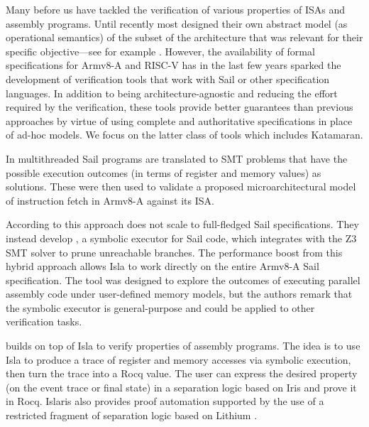 Many before us have tackled the verification of various properties of ISAs and assembly programs. Until recently most designed their own abstract model (\eg as operational semantics) of the subset of the architecture that was relevant for their specific objective---see for example \cite{Georges2021}\cite{Jensen2013}\cite{Guanciale2016}. However, the availability of formal specifications for Armv8-A and RISC-V \cite{Armstrong2019} has in the last few years sparked the development of verification tools that work with Sail or other specification languages. In addition to being architecture-agnostic and reducing the effort required by the verification, these tools provide better guarantees than previous approaches by virtue of using complete and authoritative specifications in place of ad-hoc models. We focus on the latter class of tools which includes Katamaran.

In \cite{Simner2020} multithreaded Sail programs are translated to SMT problems that have the possible execution outcomes (in terms of register and memory values) as solutions. These were then used to validate a proposed microarchitectural model of instruction fetch in Armv8-A against its ISA.

According to \cite{Armstrong2021} this approach does not scale to full-fledged Sail specifications. They instead develop , a symbolic executor for Sail code, which integrates with the Z3 SMT solver to prune unreachable branches. The performance boost from this hybrid approach allows Isla to work directly on the entire Armv8-A Sail specification. The tool was designed to explore the outcomes of executing parallel assembly code under user-defined memory models, but the authors remark that the symbolic executor is general-purpose and could be applied to other verification tasks.

 \cite{Sammler2022} builds on top of Isla to verify properties of assembly programs. The idea is to use Isla to produce a trace of register and memory accesses via symbolic execution, then turn the trace into a Rocq value. The user can express the desired property (on the event trace or final state) in a separation logic based on Iris and prove it in Rocq. Islaris also provides proof automation supported by the use of a restricted fragment of separation logic based on Lithium \cite{Sammler2021}.

